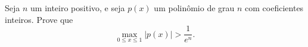 Seja \(n\) um inteiro positivo, e seja \(p(x)\) um polinômio de grau \(n\) com coeficientes inteiros. Prove que
\[
\max_{0\le x\le1} \big|p(x)\big| > \frac1{e^n}.
\]
